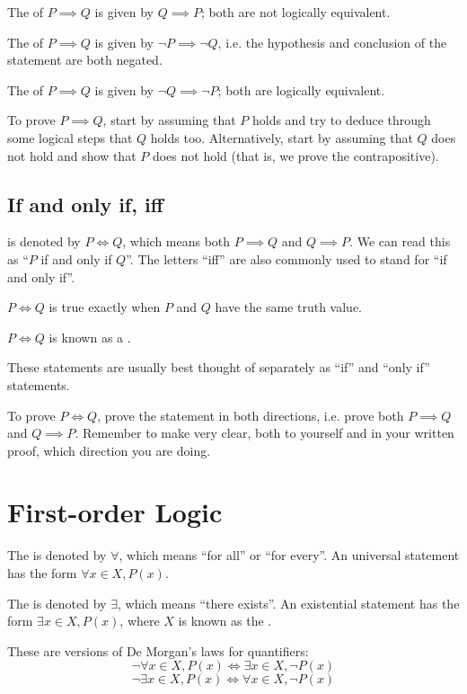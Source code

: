 The  of $P \implies Q$ is given by $Q \implies P$; both are not logically equivalent.

The  of $P \implies Q$ is given by $\lnot P \implies \lnot Q$, i.e. the hypothesis and conclusion of the statement are both negated.

The  of $P \implies Q$ is given by $\lnot Q \implies \lnot P$; both are logically equivalent.

To prove $P \implies Q$, start by assuming that $P$ holds and try to deduce through some logical steps that $Q$ holds too. Alternatively, start by assuming that $Q$ does not hold and show that $P$ does not hold (that is, we prove the contrapositive).

\subsection{If and only if, iff}
 is denoted by $P \iff Q$, which means both $P \implies Q$ and $Q \implies P$. We can read this as ``$P$ if and only if $Q$''. The letters ``iff'' are also commonly used to stand for ``if and only if''.

$P \iff Q$ is true exactly when $P$ and $Q$ have the same truth value.

$P \iff Q$ is known as a .

These statements are usually best thought of separately as ``if'' and ``only if'' statements.

To prove $P \iff Q$, prove the statement in both directions, i.e. prove both $P \implies Q$ and $Q \implies P$. Remember to make very clear, both to yourself and in your written proof, which direction you are doing.

\section{First-order Logic}
The  is denoted by $\forall$, which means ``for all'' or ``for every''. An universal statement has the form $\forall x\in X, P(x)$.

The  is denoted by $\exists$, which means ``there exists''. An existential statement has the form $\exists x\in X, P(x)$, where $X$ is known as the .

These are versions of De Morgan's laws for quantifiers:
\[ \lnot \forall x\in X,P(x) \iff \exists x\in X,\lnot P(x) \]
\[ \lnot \exists x\in X,P(x) \iff \forall x\in X,\lnot P(x) \]

